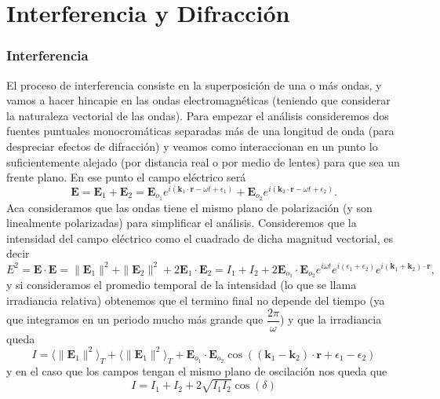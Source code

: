 \documentclass[a4paper,spanish]{article}
\numberwithin{equation}{section}
\begin{document}
\part{Interferencia y Difracci\'on}

\section{Interferencia}
	\label{sec:interferencia}
	El proceso de interferencia consiste en la superposici\'on de una o m\'as ondas, y vamos a hacer hincapie en las ondas electromagn\'eticas (teniendo que considerar la naturaleza vectorial de las ondas). Para empezar el an\'alisis consideremos dos fuentes puntuales monocrom\'aticas separadas m\'as de una longitud de onda (para despreciar efectos de difracci\'on) y veamos como interaccionan en un punto lo suficientemente alejado (por distancia real o por medio de lentes) para que sea un frente plano. En ese punto el campo el\'ectrico ser\'a \[\textbf{E} = \textbf{E}_{1} + \textbf{E}_2 = \textbf{E}_{o_1} e^{i (\textbf{k}_1 \cdot \textbf{r} - \omega t + \epsilon_1)} + \textbf{E}_{o_2} e^{i (\textbf{k}_2 \cdot \textbf{r} - \omega t + \epsilon_2)}.\] Aca consideramos que las ondas tiene el mismo plano de polarizaci\'on (y son linealmente polarizadas) para simplificar el an\'alisis. Consideremos que la intensidad del campo el\'ectrico como el cuadrado de dicha magnitud vectorial, es decir \[E^2 = \textbf{E} \cdot \textbf{E} = \|\textbf{E}_1\|^2 + \|\textbf{E}_2\|^2 + 2 \textbf{E}_1 \cdot \textbf{E}_2 = I_1 + I_2 + 2 \textbf{E}_{o_1} \cdot \textbf{E}_{o_2} e^{i \omega t} e^{ i (\epsilon_1 + \epsilon_2)} e^{i (\textbf{k}_1 + \textbf{k}_2) \cdot \textbf{r}},\] y si consideramos el promedio temporal de la intensidad (lo que se llama irradiancia relativa) obtenemos que el termino final no depende del tiempo (ya que integramos en un periodo mucho m\'as grande que $\dfrac{2\pi}{\omega}$) y que la irradiancia queda 
	\begin{equation}
		I = \langle\|\textbf{E}_1\|^2\rangle_T + \langle\|\textbf{E}_1\|^2\rangle_T + \textbf{E}_{o_1} \cdot \textbf{E}_{o_2} \cos((\textbf{k}_1 - \textbf{k}_2)\cdot \textbf{r} + \epsilon_1 - \epsilon_2)
		\label{eq:interferencia_general}
	\end{equation}
	y en el caso que los campos tengan el mismo plano de oscilaci\'on nos queda que
	\begin{equation}
		I = I_1 + I_2 + 2 \sqrt{I_1 I_2} \cos(\delta)
		\label{eq:interferencia_particular}
	\end{equation}
\end{document}
